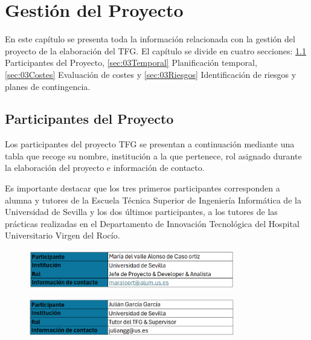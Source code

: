 \chapter{Gestión del Proyecto}\label{cap:03gestión}

En este capítulo se presenta toda la información relacionada con la gestión del proyecto de la elaboración del TFG. El capítulo se divide en cuatro secciones: \ref{sec:03Participantes} Participantes del Proyecto,
\ref{sec:03Temporal} Planificación temporal, \ref{sec:03Costes} Evaluación de costes y \ref{sec:03Riesgos} Identificación de riesgos y planes de contingencia.

\section{Participantes del Proyecto} \label{sec:03Participantes}

Los participantes del proyecto TFG se presentan a continuación mediante una tabla que recoge su nombre, institución a la que pertenece, rol asignado durante la elaboración del proyecto e información de contacto. 

Es importante destacar que los tres primeros participantes corresponden a alumna y tutores de la Escuela Técnica Superior de Ingeniería Informática de la Universidad de Sevilla y los dos últimos participantes, a los tutores de las prácticas realizadas en el Departamento de Innovación Tecnológica del Hospital Universitario Virgen del Rocío.

%

\begin{figure}[H]
    \centering
    \includegraphics[width=0.80\textwidth]{tables/primerParticipante.png}
    \label{table:primerParticipante}
\end{figure}

\begin{figure}[H]
    \centering
    \includegraphics[width=0.80\textwidth]{tables/segundoParticipante.png}
    \label{table:segundoParticipante}
\end{figure}

